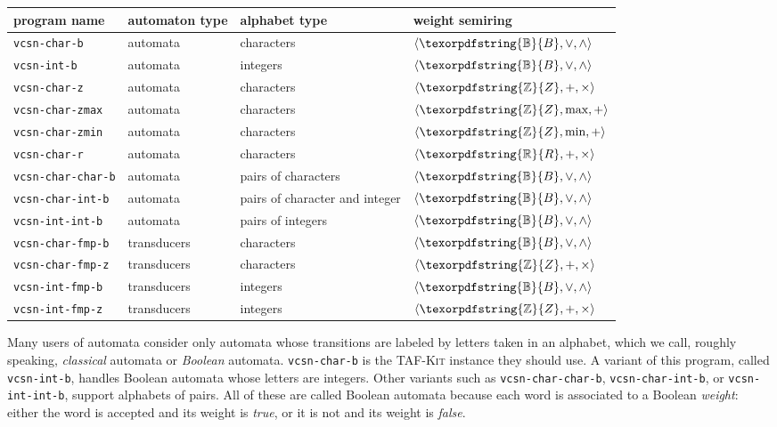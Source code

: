 \documentclass[a4paper]{report}
\renewcommand{\max}{\textrm{max}}
\renewcommand{\min}{\textrm{min}}
\newcommand{\Z}{\texorpdfstring{\ensuremath{\mathbb{Z}}}{Z}}
\newcommand{\R}{\texorpdfstring{\ensuremath{\mathbb{R}}}{R}}
\newcommand{\B}{\texorpdfstring{\ensuremath{\mathbb{B}}}{B}}
\newcommand\command[1]{\texttt{#1}}
\newcommand{\tafkit}{\textsc{TAF-Kit}\xspace}
\begin{document}
\begin{center}
\begin{tabular}{llll}
program name & automaton type & alphabet type & weight semiring \\
\hline
\command{vcsn-char-b} & automata &
  characters & $\langle\B,\lor,\land\rangle$ \\
\command{vcsn-int-b} & automata &
  integers & $\langle\B,\lor,\land\rangle$ \\
\command{vcsn-char-z} & automata &
  characters & $\langle\Z,+,\times\rangle$\\
\command{vcsn-char-zmax} & automata &
  characters & $\langle\Z,\max,+\rangle$\\
\command{vcsn-char-zmin} & automata &
  characters & $\langle\Z,\min,+\rangle$\\
\command{vcsn-char-r} & automata &
  characters & $\langle\R,+,\times\rangle$\\
\command{vcsn-char-char-b} & automata &
  pairs of characters & $\langle\B,\lor,\land\rangle$\\
\command{vcsn-char-int-b} & automata &
  pairs of character and integer & $\langle\B,\lor,\land\rangle$\\
\command{vcsn-int-int-b} & automata &
  pairs of integers & $\langle\B,\lor,\land\rangle$\\
\command{vcsn-char-fmp-b} & transducers &
  characters & $\langle\B,\lor,\land\rangle$\\
\command{vcsn-char-fmp-z} & transducers &
  characters & $\langle\Z,+,\times\rangle$\\
\command{vcsn-int-fmp-b} & transducers &
  integers & $\langle\B,\lor,\land\rangle$\\
\command{vcsn-int-fmp-z} & transducers &
  integers & $\langle\Z,+,\times\rangle$\\
\hline
\end{tabular}
\end{center}

\medskip

Many users of automata consider only automata whose transitions are
labeled by letters taken in an alphabet, which we call, roughly
speaking, \emph{classical} automata or \emph{Boolean}
automata. \command{vcsn-char-b} is the \tafkit instance they should
use.  A variant of this program, called \command{vcsn-int-b}, handles
Boolean automata whose letters are integers.  Other variants such as
\command{vcsn-char-char-b}, \command{vcsn-char-int-b}, or
\command{vcsn-int-int-b}, support alphabets of pairs.  All of these
are called Boolean automata because each word is associated to a
Boolean \emph{weight}: either the word is accepted and its weight is
\emph{true}, or it is not and its weight is \emph{false}.
\end{document}
